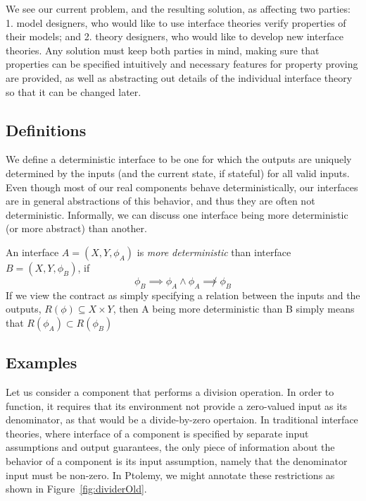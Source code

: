 \documentclass[preprint,11pt]{sigplanconf}
\begin{document}
We see our current problem, and the resulting solution, as affecting two
parties:
1. model designers, who would like to use interface theories verify properties
of their models; and
2. theory designers, who would like to develop new interface theories.
%
Any solution must keep both parties in mind, making sure that properties
can be specified intuitively and necessary features for property proving are
provided, as well as abstracting out details of the individual interface theory
so that it can be changed later.

\subsection{Definitions}
We define a deterministic interface to be one for which the outputs are
uniquely determined by the inputs (and the current state, if stateful) for all
valid inputs.
Even though most of our real components behave deterministically, our
interfaces are in general abstractions of this behavior, and thus they are
often not deterministic.
Informally, we can discuss one interface being more deterministic (or more
abstract) than another.

An interface $A=(X,Y,\phi_A)$ is \emph{more deterministic} than interface
$B=(X,Y,\phi_B)$, if
\[
\phi_B \implies \phi_A \wedge \phi_A \not\implies \phi_B
\]
If we view the contract as simply specifying a relation between the inputs and
the outputs, $R(\phi) \subseteq X \times Y$, then A being more deterministic
than B simply means that $R(\phi_A) \subset R(\phi_B)$


\subsection{Examples}
Let us consider a component that performs a division operation.  In order to
function, it requires that its environment not provide a zero-valued input as
its denominator, as that would be a divide-by-zero opertaion. In traditional
interface theories, where interface of a component is specified by separate
input assumptions and output guarantees, the only piece of information about
the behavior of a component is its input assumption, namely that the
denominator input must be non-zero. In Ptolemy, we might annotate these
restrictions as shown in Figure~\ref{fig:dividerOld}.
\end{document}
